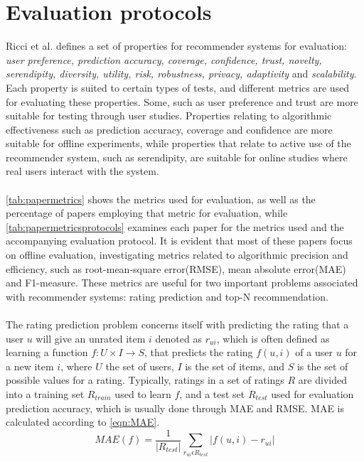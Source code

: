 \section{Evaluation protocols}\label{sec:evaluationmetrics}
Ricci et al. \cite{RecommenderHandbook2015} defines a set of properties for recommender systems for evaluation: \textit{user preference, prediction accuracy, coverage, confidence, trust, novelty, serendipity, diversity, utility, risk, robustness, privacy, adaptivity} and \textit{scalability}.
Each property is suited to certain types of tests, and different metrics are used for evaluating these properties.
Some, such as user preference and trust are more suitable for testing through user studies.
Properties relating to algorithmic effectiveness such as prediction accuracy, coverage and confidence are more suitable for offline experiments, while properties that relate to active use of the recommender system, such as serendipity, are suitable for online studies where real users interact with the system.
\\\\
\autoref{tab:papermetrics} shows the metrics used for evaluation, as well as the percentage of papers employing that metric for evaluation, while \autoref{tab:papermetricsprotocols} examines each paper for the metrics used and the accompanying evaluation protocol.
It is evident that most of these papers focus on offline evaluation, investigating metrics related to algorithmic precision and efficiency, such as root-mean-square error(RMSE), mean absolute error(MAE) and F1-measure.
These metrics are useful for two important problems associated with recommender systems: rating prediction and top-N recommendation\cite{RecommenderHandbook2015}.
\\\\
The rating prediction problem concerns itself with predicting the rating that a user $u$ will give an unrated item $i$ denoted as $r_{ui}$, which is often defined as learning a function $f : U \times I \rightarrow S$, that predicts the rating $f(u, i)$ of a user $u$ for a new item $i$, where $U$ the set of users, $I$ is the set of items, and $S$ is the set of possible values for a rating.
Typically, ratings in a set of ratings $R$ are divided into a training set $R_{train}$ used to learn $f$, and a test set $R_{test}$ used for evaluation prediction accuracy, which is usually done through MAE and RMSE.
MAE is calculated according to \autoref{eqn:MAE}.
\begin{equation}
    \label{eqn:MAE}
    MAE(f) = \frac{1}{|R_{test}|} \sum\limits_{r_{ui} \epsilon R_{test}} |f(u,i)-r_{ui}|
\end{equation}
